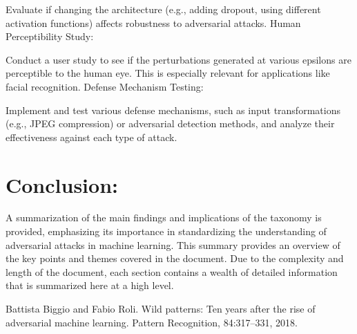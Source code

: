 \documentclass[10pt, conference, a4paper, final]{IEEEtran}
\begin{document}
Evaluate if changing the architecture (e.g., adding dropout, using different activation functions) affects robustness to adversarial attacks.
Human Perceptibility Study:

Conduct a user study to see if the perturbations generated at various epsilons are perceptible to the human eye. This is especially relevant for applications like facial recognition.
Defense Mechanism Testing:

Implement and test various defense mechanisms, such as input transformations (e.g., JPEG compression) or adversarial detection methods, and analyze their effectiveness against each type of attack.
\section{Conclusion:}

A summarization of the main findings and implications of the taxonomy is provided, emphasizing its importance in standardizing the understanding of adversarial attacks in machine learning.
This summary provides an overview of the key points and themes covered in the document. Due to the complexity and length of the document, each section contains a wealth of detailed information that is summarized here at a high level.
\begin{thebibliography}{01}

Battista Biggio and Fabio Roli. Wild patterns: Ten years after the rise of adversarial machine learning. Pattern Recognition, 84:317–331, 2018.


\end{thebibliography}
\end{document}
